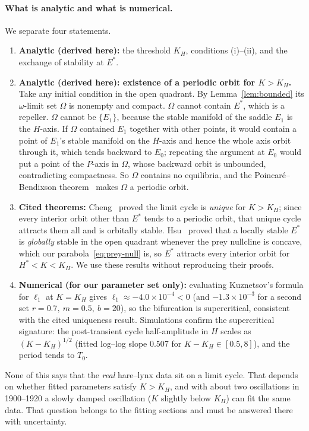 \paragraph{What is analytic and what is numerical.} We separate four statements.
\begin{enumerate}
\item \textbf{Analytic (derived here):} the threshold $K_H$, conditions (i)--(ii), and the
exchange of stability at $E^*$.
\item \textbf{Analytic (derived here): existence of a periodic orbit for $K>K_H$.}
Take any initial condition in the open quadrant. By Lemma~\ref{lem:bounded} its $\omega$-limit
set $\Omega$ is nonempty and compact. $\Omega$ cannot contain $E^*$, which is a repeller.
$\Omega$ cannot be $\{E_1\}$, because the stable manifold of the saddle $E_1$ is the $H$-axis.
If $\Omega$ contained $E_1$ together with other points, it would contain a point of $E_1$'s
stable manifold on the $H$-axis and hence the whole axis orbit through it, which tends backward
to $E_0$; repeating the argument at $E_0$ would put a point of the $P$-axis in $\Omega$, whose
backward orbit is unbounded, contradicting compactness. So $\Omega$ contains no equilibria, and
the Poincar\'e--Bendixson theorem~\cite{strogatz2015} makes $\Omega$ a periodic orbit.
\item \textbf{Cited theorems:} Cheng~\cite{cheng1981} proved the limit cycle is \emph{unique} for
$K>K_H$; since every interior orbit other than $E^*$ tends to a periodic orbit, that unique cycle
attracts them all and is orbitally stable. Hsu~\cite{hsu1978} proved that a locally stable $E^*$
is \emph{globally} stable in the open quadrant whenever the prey nullcline is concave, which our
parabola~\eqref{eq:prey-null} is, so $E^*$ attracts every interior orbit for $H^*<K<K_H$.
We use these results without reproducing their proofs.
\item \textbf{Numerical (for our parameter set only):} evaluating Kuznetsov's formula for
$\ell_1$ at $K=K_H$ gives $\ell_1\approx-4.0\times10^{-4}<0$ (and $-1.3\times10^{-3}$ for a second
set $r=0.7,\ m=0.5,\ b=20$), so the bifurcation is supercritical, consistent with the cited
uniqueness result. Simulations confirm the supercritical signature: the post-transient cycle
half-amplitude in $H$ scales as $(K-K_H)^{1/2}$ (fitted log--log slope $0.507$ for
$K-K_H\in[0.5,8]$), and the period tends to $T_0$.
\end{enumerate}

\noindent None of this says that the \emph{real} hare--lynx data sit on a limit cycle. That
depends on whether fitted parameters satisfy $K>K_H$, and with about two oscillations in
1900--1920 a slowly damped oscillation ($K$ slightly below $K_H$) can fit the same data.
That question belongs to the fitting sections and must be answered there with uncertainty.

